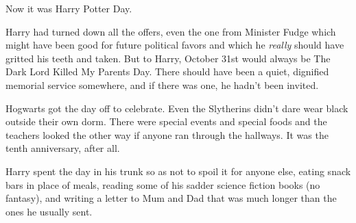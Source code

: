 Now it was Harry Potter Day.

Harry had turned down all the offers, even the one from Minister Fudge which 
might have been good for future political favors and which he \emph{really} 
should have gritted his teeth and taken. But to Harry, October 31st would 
always be The Dark Lord Killed My Parents Day. There should have been a quiet, 
dignified memorial service somewhere, and if there was one, he hadn't been 
invited.

Hogwarts got the day off to celebrate. Even the Slytherins didn't dare wear 
black outside their own dorm. There were special events and special foods and 
the teachers looked the other way if anyone ran through the hallways. It was 
the tenth anniversary, after all.

Harry spent the day in his trunk so as not to spoil it for anyone else, eating 
snack bars in place of meals, reading some of his sadder science fiction books 
(no fantasy), and writing a letter to Mum and Dad that was much longer than the 
ones he usually sent.

